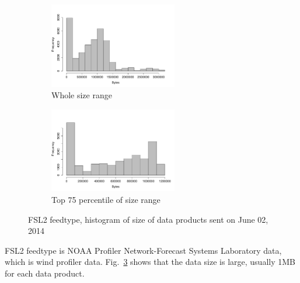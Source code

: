 \begin{figure}[htb!]
\centering
    \begin{subfigure}{0.5\linewidth}
        \centering
        \includegraphics[width=2.2in]{figures/size-hist-FSL20602.pdf}
        \caption{Whole size range}
        \label{FSL2_Size_Whole}
    \end{subfigure}\hfill
    \begin{subfigure}{0.5\linewidth}
	\centering
    \includegraphics[width=2.2in]{figures/size-hist-FSL20602-TOP75.pdf}
        \caption{Top 75 percentile of size range }
        \label{FSL2_Size_75}
    \end{subfigure}\hfill
    \caption{FSL2 feedtype, histogram of size of data products sent on June 02, 2014}
    \label{FSL2_Size}
\end{figure}

FSL2 feedtype \cite{FSL2} is NOAA Profiler Network-Forecast Systems Laboratory data, which is wind profiler data. Fig.~\ref{FSL2_Size} shows that the data size is large, usually 1MB for each data product.

